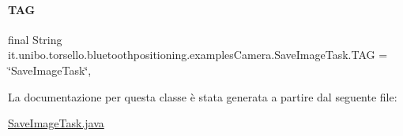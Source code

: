 \paragraph{\texorpdfstring{T\+AG}{TAG}}
{\footnotesize\ttfamily final String it.\+unibo.\+torsello.\+bluetoothpositioning.\+examples\+Camera.\+Save\+Image\+Task.\+T\+AG = \char`\"{}Save\+Image\+Task\char`\"{}\hspace{0.3cm}{\ttfamily [static]}, {\ttfamily [private]}}



La documentazione per questa classe è stata generata a partire dal seguente file\+:\begin{DoxyCompactItemize}
\item 
\hyperlink{SaveImageTask_8java}{Save\+Image\+Task.\+java}\end{DoxyCompactItemize}
